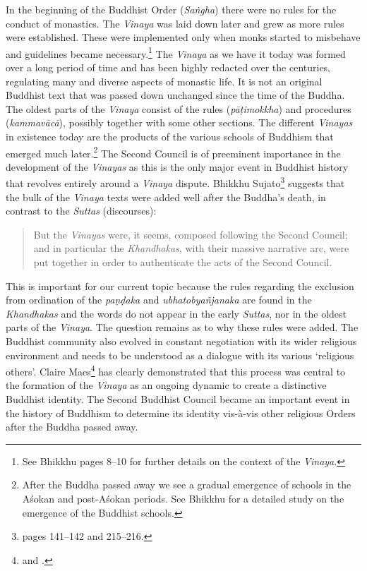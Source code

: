 In the beginning of the Buddhist Order ({\em Saṅgha}) there were no rules for the conduct of monastics. The {\em Vinaya} was laid down later and grew as more rules were established. These were implemented only when monks started to misbehave and guidelines became necessary.\footnote{See Bhikkhu \cite{sujato2009} pages 8–10 for further details on the context of the {\em Vinaya}.} The {\em Vinaya} as we have it today was formed over a long period of time and has been highly redacted over the centuries, regulating many and diverse aspects of monastic life. It is not an original Buddhist text that was passed down unchanged since the time of the Buddha. The oldest parts of the {\em Vinaya} consist of the rules ({\em pāṭimokkha}) and procedures ({\em kammavācā}), possibly together with some other sections. The different {\em Vinayas} in existence today are the products of the various schools of Buddhism that emerged much later.\footnote{After the Buddha passed away we see a gradual emergence of schools in the Aśokan and post-Aśokan periods. See Bhikkhu \cite{sujato2012} for a detailed study on the emergence of the Buddhist schools.} The Second Council is of preeminent importance in the development of the {\em Vinayas} as this is the only major event in Buddhist history that revolves entirely around a {\em Vinaya} dispute. Bhikkhu Sujato\footnote{\cite{sujato2009} pages 141–142 and 215–216.} suggests that the bulk of the {\em Vinaya} texts were added well after the Buddha's death, in contrast to the {\em Suttas} (discourses): 

\begin{quote}
But the {\em Vinayas} were, it seems, composed following the Second Council; and in particular the {\em Khandhakas}, with their massive narrative arc, were put together in order to authenticate the acts of the Second Council.
\end{quote}

This is important for our current topic because the rules regarding the exclusion from ordination of the {\em paṇḍaka} and {\em ubhatob­yañ­janaka} are found in the {\em Khandhakas} and the words do not appear in the early {\em Suttas}, nor in the oldest parts of the {\em Vinaya}. The question remains as to why these rules were added. The Buddhist community also evolved in constant negotiation with its wider religious environment and needs to be understood as a dialogue with its various `religious others'. Claire Maes\footnote{\cite{maes} and \cite{maes2016}.} has clearly demonstrated that this process was central to the formation of the {\em Vinaya} as an ongoing dynamic to create a distinctive Buddhist identity. The Second Buddhist Council became an important event in the history of Buddhism to determine its identity vis-à-vis other religious Orders after the Buddha passed away.

